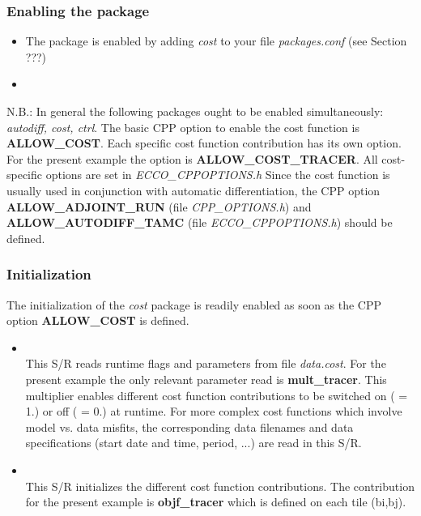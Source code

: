 

\subsubsection{Enabling the package}

\begin{itemize}
%
\item
The package is enabled by adding {\it cost} to your file {\it packages.conf}
(see Section ???)
%
\item


\end{itemize}
%

N.B.: In general the following packages ought to be enabled
simultaneously: {\it autodiff, cost, ctrl}.
The basic CPP option to enable the cost function is {\bf ALLOW\_COST}.
Each specific cost function contribution has its own option.
For the present example the option is {\bf ALLOW\_COST\_TRACER}.
All cost-specific options are set in {\it ECCO\_CPPOPTIONS.h}
Since the cost function is usually used in conjunction with
automatic differentiation, the CPP option
{\bf ALLOW\_ADJOINT\_RUN} (file {\it CPP\_OPTIONS.h}) and
{\bf ALLOW\_AUTODIFF\_TAMC} (file {\it ECCO\_CPPOPTIONS.h})
should be defined.

\subsubsection{Initialization}
%
The initialization of the {\it cost} package is readily enabled
as soon as the CPP option {\bf ALLOW\_COST} is defined.
%
\begin{itemize}
%
\item 
{}
\\
This S/R 
reads runtime flags and parameters from file {\it data.cost}.
For the present example the only relevant parameter read
is {\bf mult\_tracer}. This multiplier enables different
cost function contributions to be switched on
( = 1.) or off ( = 0.) at runtime.
For more complex cost functions which involve model vs. data
misfits, the corresponding data filenames and data
specifications (start date and time, period, ...) are read
in this S/R.
%
\item 
{}
\\
This S/R 
initializes the different cost function contributions.
The contribution for the present example is {\bf objf\_tracer}
which is defined on each tile (bi,bj).
%
\end{itemize}
%

